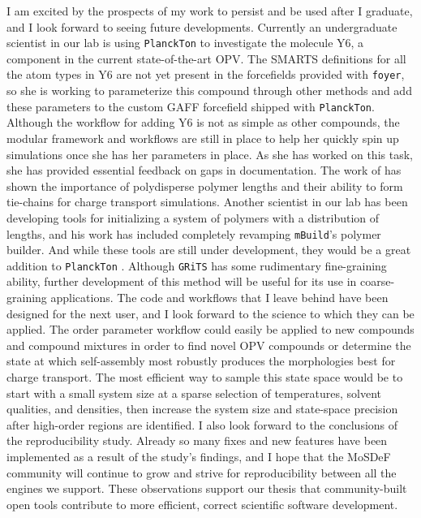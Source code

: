 I am excited by the prospects of my work to persist and be used after I graduate, and I look forward to seeing future developments. 
Currently an undergraduate scientist in our lab is using \texttt{PlanckTon} to investigate the molecule Y6, a component in the current state-of-the-art OPV.
The SMARTS definitions for all the atom types in Y6 are not yet present in the forcefields provided with \texttt{foyer}, so she is working to parameterize this compound through other methods and add these parameters to the custom GAFF forcefield shipped with \texttt{PlanckTon}.
Although the workflow for adding Y6 is not as simple as other compounds, the modular framework and workflows are still in place to help her quickly spin up simulations once she has her parameters in place.
As she has worked on this task, she has provided essential feedback on gaps in documentation.
The work of \citet{Miller2018a} has shown the importance of polydisperse polymer lengths and their ability to form tie-chains for charge transport simulations. 
Another scientist in our lab has been developing tools for initializing a system of polymers with a distribution of lengths, and his work has included completely revamping \texttt{mBuild}'s polymer builder.
And while these tools are still under development, they would be a great addition to \texttt{PlanckTon} \cite{polybinder}.
Although \texttt{GRiTS} has some rudimentary fine-graining ability, further development of this method will be useful for its use in coarse-graining applications.
The code and workflows that I leave behind have been designed for the next user, and I look forward to the science to which they can be applied. 
The order parameter workflow could easily be applied to new compounds and compound mixtures in order to find novel OPV compounds or determine the state at which self-assembly most robustly produces the morphologies best for charge transport.
The most efficient way to sample this state space would be to start with a small system size at a sparse selection of temperatures, solvent qualities, and densities, then increase the system size and state-space precision after high-order regions are identified.
I also look forward to the conclusions of the reproducibility study.
Already so many fixes and new features have been implemented as a result of the study's findings, and I hope that the MoSDeF community will continue to grow and strive for reproducibility between all the engines we support.
These observations support our thesis that community-built open tools contribute to more efficient, correct scientific software development.